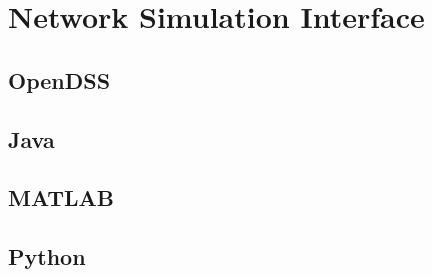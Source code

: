 \chapter{Network Simulation Interface}

\section{OpenDSS}

\section{Java}

\section{MATLAB}

\section{Python}